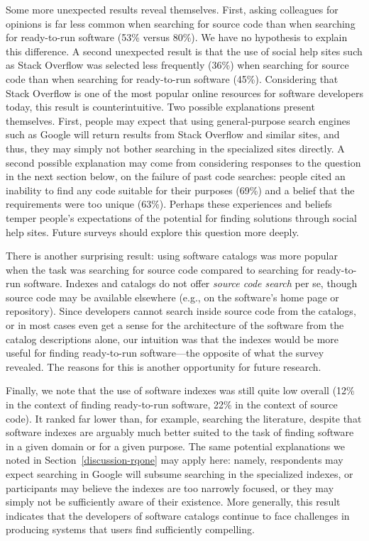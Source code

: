 \documentclass[review]{elsarticle}
\begin{document}
Some more unexpected results reveal themselves.  First, asking colleagues for opinions is far less common when searching for source code than when searching for ready-to-run software (53\% versus 80\%).  We have no hypothesis to explain this difference.  A second unexpected result is that the use of social help sites such as Stack Overflow was selected less frequently (36\%) when searching for source code than when searching for ready-to-run software (45\%).  Considering that Stack Overflow is one of the most popular online resources for software developers today, this result is counterintuitive.  Two possible explanations present themselves.  First, people may expect that using general-purpose search engines such as Google will return results from Stack Overflow and similar sites, and thus, they may simply not bother searching in the specialized sites directly.  A second possible explanation may come from considering responses to the question in the next section below, on the failure of past code searches: people cited an inability to find any code suitable for their purposes (69\%) and a belief that the requirements were too unique (63\%).  Perhaps these experiences and beliefs temper people's expectations of the potential for finding solutions through social help sites.  Future surveys should explore this question more deeply.

There is another surprising result: using software catalogs was more popular when the task was searching for source code compared to searching for ready-to-run software.  Indexes and catalogs do not offer \emph{source code search} per se, though source code may be available elsewhere (e.g., on the software's home page or repository).  Since developers cannot search inside source code from the catalogs, or in most cases even get a sense for the architecture of the software from the catalog descriptions alone, our intuition was that the indexes would be more useful for finding ready-to-run software---the opposite of what the survey revealed.  The reasons for this is another opportunity for future research.

Finally, we note that the use of software indexes was still quite low overall (12\% in the context of finding ready-to-run software, 22\% in the context of source code).  It ranked far lower than, for example, searching the literature, despite that software indexes are arguably much better suited to the task of finding software in a given domain or for a given purpose.  The same potential explanations we noted in Section~\ref{discussion-rqone} may apply here: namely, respondents may expect searching in Google will subsume searching in the specialized indexes, or participants may believe the indexes are too narrowly focused, or they may simply not be sufficiently aware of their existence.  More generally, this result indicates that the developers of software catalogs continue to face challenges in producing systems that users find sufficiently compelling.
\end{document}
